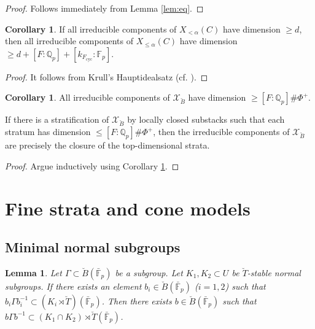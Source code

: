 \documentclass[11pt]{amsart}
\newcommand{\MINOREDITED}[1]{#1}
\newtheorem{lem}[thm]{Lemma}
\theoremstyle{definition}
\newtheorem{cor}[thm]{Corollary}
\newcommand{\Q}{\mathbb{Q}}
\newcommand{\F}{\mathbb{F}}
\newcommand{\bFp}{\bar{\mathbb{F}}_p}
\newcommand{\cX}{\mathcal{X}}
\newcommand{\bB}{\breve{B}}
\newcommand{\bT}{\breve{T}}
\newcommand{\cyc}{{\operatorname{cyc}}}
\newcommand{\dkF}{[k_{F_{\cyc}}:\F_p]}
\newcommand{\dF}{[F:\Q_p]}
\begin{document}
\begin{proof}
Follows immediately from Lemma \ref{lem:eq}.
\end{proof}

\begin{cor}
If all irreducible components of $X_{<\alpha}(C)$
have dimension $\ge d$,
then
all irreducible components of
$X_{\le\alpha}(C)$
\MINOREDITED{have dimension}
$\ge d+\dF+\dkF$.
\label{cor:least-dim}
\end{cor}

\begin{proof}
It follows from 
Krull's Hauptidealsatz
(cf. \cite[Tag 0EPZ]{Stacks}).
\end{proof}

\begin{cor}
All irreducible components of
$\cX_{\bB}$
have dimension $\ge \dF\#\Phi^+$.

If there is a stratification of $\cX_{\bB}$
by locally closed substacks
such that each stratum has dimension $\le \dF\#\Phi^+$,
then the irreducible components of $\cX_{\bB}$
are precisely the closure of the top-dimensional
strata.
\label{cor:XB-dim}
\end{cor}

\begin{proof}
Argue inductively using Corollary
\ref{cor:least-dim}.
\end{proof}

\section{Fine strata and cone models}

\subsection{Minimal normal subgroups}

\begin{lem}
Let $\Gamma\subset \bB(\bFp)$ be a subgroup.
Let $K_1, K_2\subset U$ be $\bT$-stable normal subgroups.
If there exists an element $b_i\in \bB(\bFp)$
($i=1,2$)
such that $b_i\Gamma b_i^{-1}\subset (K_i\rtimes \bT)(\bFp)$.
Then there exists $b\in \bB(\bFp)$
such that
$b \Gamma b^{-1}\subset (K_1\cap K_2)\rtimes \bT(\bFp)$.
\end{lem}
\end{document}
